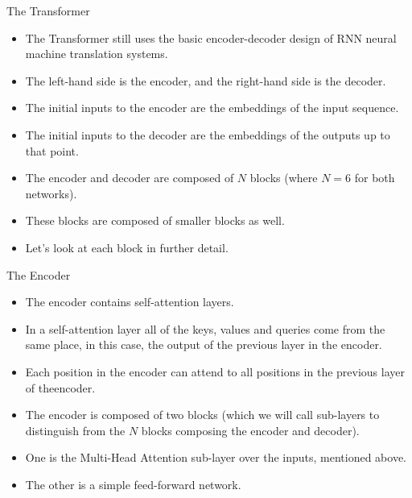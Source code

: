 \documentclass[handout]{beamer}
\begin{document}
\begin{frame}{The Transformer}
\begin{scriptsize}
\begin{itemize}

 \item  The Transformer still uses the basic encoder-decoder design of RNN neural machine translation systems.
 
 \item The left-hand side is the encoder, and the right-hand side is the decoder. 
 
 \item The initial inputs to the encoder are the embeddings of the input sequence.
 \item The initial inputs to the decoder are the embeddings of the outputs up to that point. 
 
 \item The encoder and decoder are composed of $N$ blocks (where $N = 6$ for both networks).
 
 \item These blocks are composed of smaller blocks as well. 
 
 \item Let's look at each block in further detail.
 
\end{itemize}

\end{scriptsize}

\end{frame}



\begin{frame}{The Encoder}
\begin{scriptsize}
\begin{itemize}

\item The encoder contains self-attention layers. 

\item In a self-attention layer all of the keys, values and queries come from the same place, in this case, the output of the previous layer in the encoder. 

\item Each position in the encoder can attend to all positions in the previous layer of theencoder.

 \item  The encoder is composed of two blocks (which we will call sub-layers to distinguish from the $N$ blocks composing the encoder and decoder).
\item  One is the Multi-Head Attention sub-layer over the inputs, mentioned above. 
\item The other is a simple feed-forward network. 

\end{itemize}

\end{scriptsize}

\end{frame}
\end{document}
